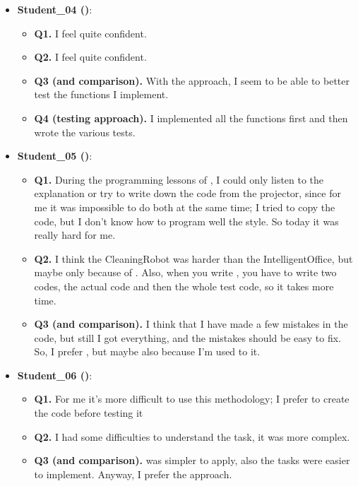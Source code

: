 \begin{itemize}
    \item \textbf{Student\_04 (\notdd)}:
    \begin{itemize}
        \item \textbf{Q1.} I feel quite confident.
        \item \textbf{Q2.} I feel quite confident.
        \item \textbf{Q3 (\tdd and \notdd comparison).} With the \notdd approach, I seem to be able to better test the functions I implement. 
        \item \textbf{Q4 (\notdd testing approach).} I implemented all the functions first and then wrote the various tests. 
    \end{itemize}

    \item \textbf{Student\_05 (\tdd)}:
    \begin{itemize}
        \item \textbf{Q1.} During the programming lessons of \tdd, I could only listen to the explanation or try to write down the code from the projector, since for me it was impossible to do both at the same time; I tried to copy the code, but I don't know how to program well the \tdd style. So today it was really hard for me.
        \item \textbf{Q2.} I think the CleaningRobot was harder than the IntelligentOffice, but maybe only because of \tdd. Also, when you write \tdd, you have to write two codes, the actual code and then the whole test code, so it takes more time.
        \item \textbf{Q3 (\tdd and \notdd comparison).} I think that I have made a few mistakes in the \notdd code, but still I got everything, and the mistakes should be easy to fix. So, I prefer \notdd, but maybe also because I'm used to it.
    \end{itemize}

    \item \textbf{Student\_06 (\tdd)}:
    \begin{itemize}
        \item \textbf{Q1.} For me it's more difficult to use this methodology; I prefer to create the code before testing it   
        \item \textbf{Q2.} I had some difficulties to understand the task, it was more complex. 
        \item \textbf{Q3 (\tdd and \notdd comparison).} \notdd was simpler to apply, also the tasks were easier to implement. Anyway, I prefer the \notdd approach.
    \end{itemize}


\end{itemize}
